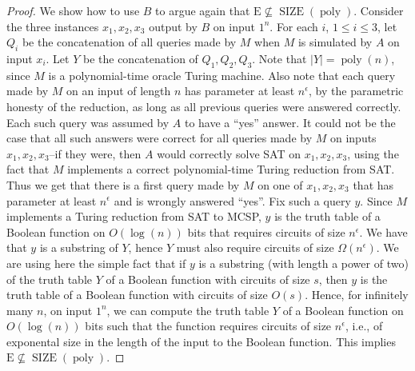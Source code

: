 \documentclass[10pt,a4paper]{article}
\newcommand{\SIZE}{\operatorname{SIZE}}
\newcommand{\poly}{\operatorname{poly}}
\begin{document}
\begin{proof}
We show how to use $B$ to argue again that $\mathrm E\not\subseteq\SIZE(\poly)$. Consider the three instances $x_1,x_2,x_3$ output by $B$ on input $1^n$. For each $i$, $1\leq i\leq3$, let $Q_i$ be the concatenation of all queries made by $M$ when $M$ is simulated by $A$ on input $x_i$. Let $Y$ be the concatenation of $Q_1,Q_2,Q_3$. Note that $|Y|=\poly(n)$, since $M$ is a polynomial-time oracle Turing machine. Also note that each query made by $M$ on an input of length $n$ has parameter at least $n^\epsilon$, by the parametric honesty of the reduction, as long as all previous queries were answered correctly. Each such query was assumed by $A$ to have a ``yes'' answer. It could not be the case that all such answers were correct for all queries made by $M$ on inputs $x_1,x_2,x_3$--if they were, then $A$ would correctly solve SAT on $x_1,x_2,x_3$, using the fact that $M$ implements a correct polynomial-time Turing reduction from SAT.
Thus we get that there is a first query made by $M$ on one of $x_1,x_2,x_3$ that has parameter at least $n^\epsilon$ and is wrongly answered ``yes''. Fix such a query $y$. Since $M$ implements a Turing reduction from SAT to MCSP, $y$ is the truth table of a Boolean function on $O(\log(n))$ bits that requires circuits of size $n^\epsilon$. We have that $y$ is a substring of $Y$, hence $Y$ must also require circuits of size $\Omega(n^\epsilon)$. We are using here the simple fact that if $y$ is a substring (with length a power of two) of the truth table $Y$ of a Boolean function with circuits of size $s$, then $y$ is the truth table of a Boolean function with circuits of size $O(s)$.
Hence, for infinitely many $n$, on input $1^n$, we can compute the truth table $Y$ of a Boolean function on $O(\log(n))$ bits such that the function requires circuits of size $n^\epsilon$, i.e., of exponental size in the length of the input to the Boolean function. This implies $\mathrm E\not\subseteq\SIZE(\poly)$.
\end{proof}
\end{document}
